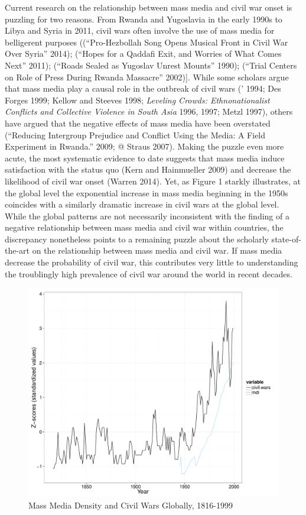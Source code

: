 \documentclass[11pt,article,oneside]{memoir}
\makeatletter
\def\maxwidth{\ifdim\Gin@nat@width>\linewidth\linewidth
\else\Gin@nat@width\fi}
\let\Oldincludegraphics\includegraphics
\renewcommand{\includegraphics}[1]{\Oldincludegraphics[width=\maxwidth]{#1}}
\makeatother
\begin{document}
\clearpage
{}

\onehalfspacing

Current research on the relationship between mass media and civil war
onset is puzzling for two reasons. From Rwanda and Yugoslavia in the
early 1990s to Libya and Syria in 2011, civil wars often involve the use
of mass media for belligerent purposes ((``Pro-Hezbollah Song Opens
Musical Front in Civil War Over Syria'' 2014); (``Hopes for a Qaddafi
Exit, and Worries of What Comes Next'' 2011); (``Roads Sealed as
Yugoslav Unrest Mounts'' 1990); (``Trial Centers on Role of Press During
Rwanda Massacre'' 2002){]}. While some scholars argue that mass media
play a causal role in the outbreak of civil wars (' 1994; Des Forges
1999; Kellow and Steeves 1998; \emph{Leveling Crowds: Ethnonationalist
Conflicts and Collective Violence in South Asia} 1996, 1997; Metzl
1997), others have argued that the negative effects of mass media have
been overstated (``Reducing Intergroup Prejudice and Conflict Using the
Media: A Field Experiment in Rwanda.'' 2009; @ Straus 2007). Making the
puzzle even more acute, the most systematic evidence to date suggests
that mass media induce satisfaction with the status quo (Kern and
Hainmueller 2009) and decrease the likelihood of civil war onset (Warren
2014). Yet, as Figure 1 starkly illustrates, at the global level the
exponential increase in mass media beginning in the 1950s coincides with
a similarly dramatic increase in civil wars at the global level. While
the global patterns are not necessarily inconsistent with the finding of
a negative relationship between mass media and civil war within
countries, the discrepancy nonetheless points to a remaining puzzle
about the scholarly state-of-the-art on the relationship between mass
media and civil war. If mass media decrease the probability of civil
war, this contributes very little to understanding the troublingly high
prevalence of civil war around the world in recent decades.

\begin{figure}[htbp]
\centering
\includegraphics{./media_civil_war_files/figure-markdown/globalplot.pdf}
\caption{Mass Media Density and Civil Wars Globally, 1816-1999}
\end{figure}
\end{document}
